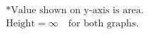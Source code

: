 \documentclass[preview]{standalone}
\begin{document}
\begin{align*}
\textrm{*Value shown on y-axis is area.} \\ \textrm{Height}=\infty \quad \textrm{for both graphs.}
\end{align*}
\end{document}
